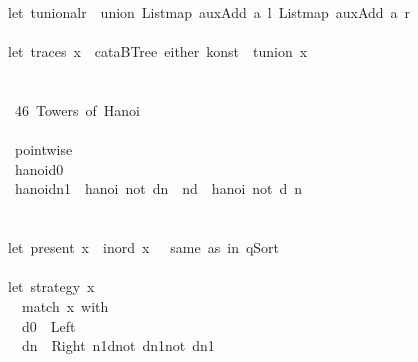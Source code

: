 \documentclass[a4paper]{article}
\begin{document}
\begin{tabbing}
\ttfamily ~let~tunionalr~~union~Listmap~auxAdd~a~l~Listmap~auxAdd~a~r\\
\ttfamily ~\\
\ttfamily ~let~traces~x~~cataBTree~either~konst~~tunion~x\\
\ttfamily ~\\
\ttfamily ~\\
\ttfamily ~~46~Towers~of~Hanoi~\\
\ttfamily ~\\
\ttfamily ~~pointwise\\
\ttfamily ~~hanoid0~~\\
\ttfamily ~~hanoidn1~~hanoi~not~dn~~nd~~hanoi~not~d~n\\
\ttfamily ~\\
\ttfamily ~\\
\ttfamily ~let~present~x~~inord~x~~~same~as~in~qSort\\
\ttfamily ~\\
\ttfamily ~let~strategy~x~~\\
\ttfamily ~~~match~x~with\\
\ttfamily ~~~d0~~Left~\\
\ttfamily ~~~dn~~Right~n1dnot~dn1not~dn1\\

\end{tabbing}
\end{document}
